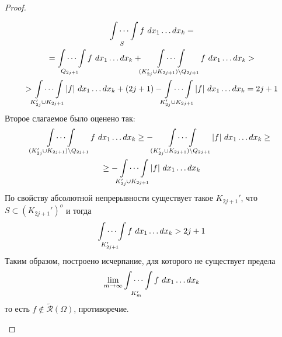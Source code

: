 \begin{proof}
\begin{itemize}
        \begin{multline*}
        \idotsint\limits_{S}f\ dx_1 \dots dx_k=\\
        =\idotsint\limits_{Q_{2j+1}}f\ dx_1 \dots dx_k+\idotsint\limits_{(K_{2j}'\cup K_{2j+1})\setminus Q_{2j+1}}f\ dx_1 \dots dx_k > \\
        >\idotsint\limits_{K_{2j}'\cup K_{2j+1}}|f|\ dx_1 \dots dx_k+(2j+1) -
        \idotsint\limits_{K_{2j}'\cup K_{2j+1}}|f|\ dx_1 \dots dx_k = 2j+1
        \end{multline*}
        Второе слагаемое было оценено так:
        \begin{multline*}
            \idotsint\limits_{(K_{2j}'\cup K_{2j+1})\setminus Q_{2j+1}}f\ dx_1 \dots dx_k \geq-\idotsint\limits_{(K_{2j}'\cup K_{2j+1})\setminus Q_{2j+1}}|f|\ dx_1 \dots dx_k \geq\\
            \geq-\idotsint\limits_{K_{2j}'\cup K_{2j+1}}|f|\ dx_1 \dots dx_k
        \end{multline*}
        По свойству абсолютной непрерывности существует такое $K_{2j+1}'$, что \\
        $S\subset (K_{2j+1}')^o$ и тогда
        \[\idotsint\limits_{K_{2j+1}'}f\ dx_1 \dots dx_k > 2j+1\]
        Таким образом, построено исчерпание, для которого не существует предела 
        \[\lim\limits_{m\to \infty}\idotsint\limits_{K'_m}f\ dx_1 \dots dx_k\]
        то есть $f\not\in \widetilde{\mathcal{R}}(\Omega)$, противоречие.
    \end{itemize}
\end{proof}
\newpage